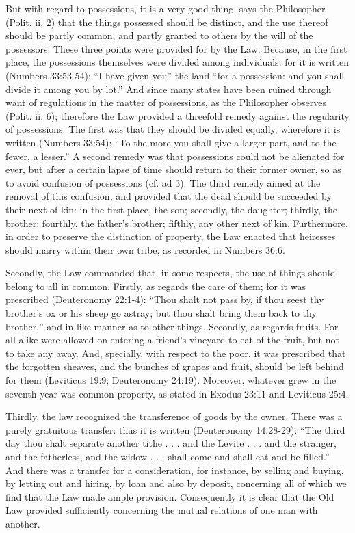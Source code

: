 But with regard to possessions, it is a very good thing, says the Philosopher (Polit. ii, 2) that the things possessed should be distinct, and the use thereof should be partly common, and partly granted to others by the will of the possessors. These three points were provided for by the Law. Because, in the first place, the possessions themselves were divided among individuals: for it is written (Numbers 33:53-54): ``I have given you'' the land ``for a possession: and you shall divide it among you by lot.'' And since many states have been ruined through want of regulations in the matter of possessions, as the Philosopher observes (Polit. ii, 6); therefore the Law provided a threefold remedy against the regularity of possessions. The first was that they should be divided equally, wherefore it is written (Numbers 33:54): ``To the more you shall give a larger part, and to the fewer, a lesser.'' A second remedy was that possessions could not be alienated for ever, but after a certain lapse of time should return to their former owner, so as to avoid confusion of possessions (cf. ad 3). The third remedy aimed at the removal of this confusion, and provided that the dead should be succeeded by their next of kin: in the first place, the son; secondly, the daughter; thirdly, the brother; fourthly, the father's brother; fifthly, any other next of kin. Furthermore, in order to preserve the distinction of property, the Law enacted that heiresses should marry within their own tribe, as recorded in Numbers 36:6.

Secondly, the Law commanded that, in some respects, the use of things should belong to all in common. Firstly, as regards the care of them; for it was prescribed (Deuteronomy 22:1-4): ``Thou shalt not pass by, if thou seest thy brother's ox or his sheep go astray; but thou shalt bring them back to thy brother,'' and in like manner as to other things. Secondly, as regards fruits. For all alike were allowed on entering a friend's vineyard to eat of the fruit, but not to take any away. And, specially, with respect to the poor, it was prescribed that the forgotten sheaves, and the bunches of grapes and fruit, should be left behind for them (Leviticus 19:9; Deuteronomy 24:19). Moreover, whatever grew in the seventh year was common property, as stated in Exodus 23:11 and Leviticus 25:4.

Thirdly, the law recognized the transference of goods by the owner. There was a purely gratuitous transfer: thus it is written (Deuteronomy 14:28-29): ``The third day thou shalt separate another tithe . . . and the Levite . . . and the stranger, and the fatherless, and the widow . . . shall come and shall eat and be filled.'' And there was a transfer for a consideration, for instance, by selling and buying, by letting out and hiring, by loan and also by deposit, concerning all of which we find that the Law made ample provision. Consequently it is clear that the Old Law provided sufficiently concerning the mutual relations of one man with another.

